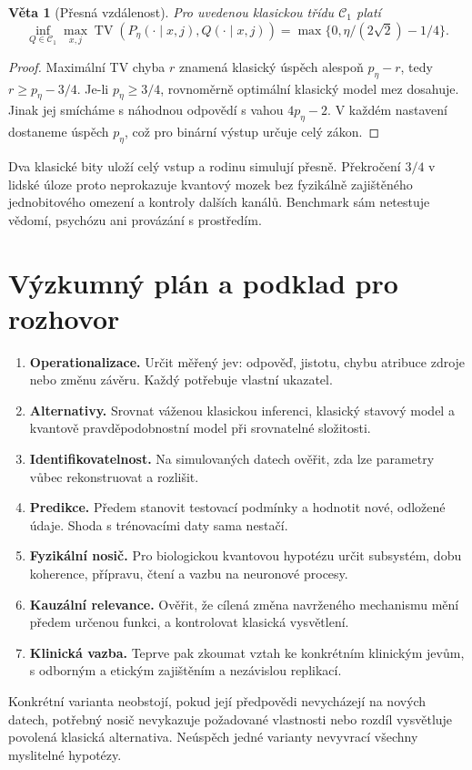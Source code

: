 \documentclass[11pt,a4paper]{article}
\newtheorem{theorem}{Věta}
\DeclareMathOperator{\TV}{TV}
\begin{document}
\begin{theorem}[Přesná vzdálenost]
Pro uvedenou klasickou třídu $\mathcal C_1$ platí
\[
\inf_{Q\in\mathcal C_1}\max_{x,j}\TV(P_\eta(\cdot\mid x,j),Q(\cdot\mid x,j))
=\max\{0,\eta/(2\sqrt2)-1/4\}.
\]
\end{theorem}
\begin{proof}
Maximální TV chyba $r$ znamená klasický úspěch alespoň $p_\eta-r$,
tedy $r\geq p_\eta-3/4$.
Je-li $p_\eta\geq3/4$, rovnoměrně optimální klasický model mez dosahuje.
Jinak jej smícháme s náhodnou odpovědí s vahou $4p_\eta-2$. V každém nastavení dostaneme úspěch $p_\eta$, což pro binární výstup určuje celý zákon.
\end{proof}
Dva klasické bity uloží celý vstup a rodinu simulují přesně. Překročení $3/4$ v lidské úloze proto neprokazuje kvantový mozek bez fyzikálně zajištěného jednobitového omezení a kontroly dalších kanálů. Benchmark sám netestuje vědomí, psychózu ani provázání s prostředím.

\newpage
\section{Výzkumný plán a podklad pro rozhovor}
\begin{enumerate}
\item \textbf{Operationalizace.} Určit měřený jev: odpověď, jistotu, chybu atribuce zdroje nebo změnu závěru. Každý potřebuje vlastní ukazatel.
\item \textbf{Alternativy.} Srovnat váženou klasickou inferenci, klasický stavový model a kvantově pravděpodobnostní model při srovnatelné složitosti.
\item \textbf{Identifikovatelnost.} Na simulovaných datech ověřit, zda lze parametry vůbec rekonstruovat a rozlišit.
\item \textbf{Predikce.} Předem stanovit testovací podmínky a hodnotit nové, odložené údaje. Shoda s trénovacími daty sama nestačí.
\item \textbf{Fyzikální nosič.} Pro biologickou kvantovou hypotézu určit subsystém, dobu koherence, přípravu, čtení a vazbu na neuronové procesy.
\item \textbf{Kauzální relevance.} Ověřit, že cílená změna navrženého mechanismu mění předem určenou funkci, a kontrolovat klasická vysvětlení.
\item \textbf{Klinická vazba.} Teprve pak zkoumat vztah ke konkrétním klinickým jevům, s odborným a etickým zajištěním a nezávislou replikací.
\end{enumerate}
Konkrétní varianta neobstojí, pokud její předpovědi nevycházejí na nových datech, potřebný nosič nevykazuje požadované vlastnosti nebo rozdíl vysvětluje povolená klasická alternativa. Neúspěch jedné varianty nevyvrací všechny myslitelné hypotézy.
\end{document}
